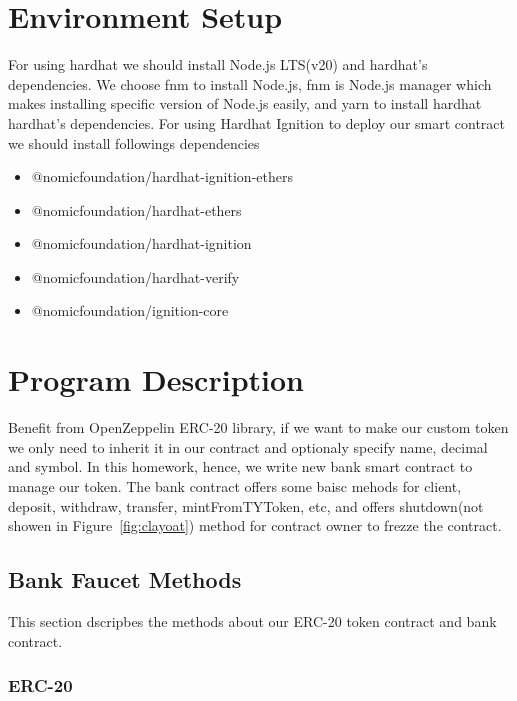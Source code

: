 \section{Environment Setup}

For using hardhat we should install Node.js LTS(v20)\cite{nodejs} and hardhat's
dependencies. We choose fnm\cite{fnm} to install Node.js, fnm is Node.js
manager which makes installing specific version of Node.js easily, and
yarn\cite{yarn} to install hardhat hardhat's dependencies. For using Hardhat Ignition
to deploy our smart contract we should install followings dependencies

\begin{itemize}
  \item @nomicfoundation/hardhat-ignition-ethers
  \item @nomicfoundation/hardhat-ethers
  \item @nomicfoundation/hardhat-ignition
  \item @nomicfoundation/hardhat-verify
  \item @nomicfoundation/ignition-core
\end{itemize}

\section{Program Description}

Benefit from OpenZeppelin ERC-20 library, if we want to make our custom token we only
need to inherit it in our contract and optionaly specify name, decimal and
symbol. In this homework, hence, we write new bank smart contract to manage our
token. The bank contract offers some baisc mehods for client, deposit, withdraw,
transfer, mintFromTYToken, etc, and offers shutdown(not showen in
Figure~\ref{fig:clayoat}) method for contract owner to frezze the contract.

\subsection{Bank Faucet Methods}

This section dscripbes the methods about our ERC-20 token contract and bank contract.

\subsubsection{ERC-20}

